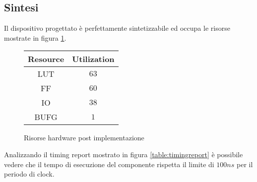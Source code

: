 \subsection{Sintesi}

Il dispositivo progettato è perfettamente sintetizzabile ed occupa le risorse mostrate in figura \ref{table:risorse}.

\begin{figure}[!ht]
    \centering
    \begin{tabular}{|c | c |}
        \hline
        Resource & Utilization \\
        \hline
        LUT      & $63$        \\
        \hline
        FF       & $60$        \\
        \hline
        IO       & $38$        \\
        \hline
        BUFG     & $1$         \\
        \hline
    \end{tabular}
    \caption{Risorse hardware post implementazione}
    \label{table:risorse}
\end{figure}

Analizzando il timing report mostrato in figura \ref{table:timingreport} è possibile vedere che il tempo di esecuzione del componente rispetta il limite di $100ns$ per il periodo di clock.

